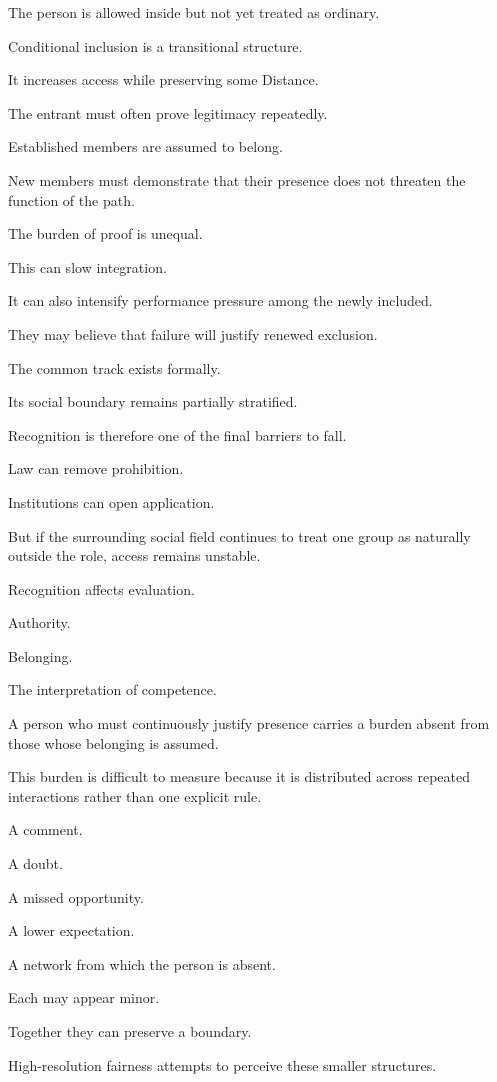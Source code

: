 The person is allowed inside but not yet treated as ordinary.

Conditional inclusion is a transitional structure.

It increases access while preserving some Distance.

The entrant must often prove legitimacy repeatedly.

Established members are assumed to belong.

New members must demonstrate that their presence does not threaten the function of the path.

The burden of proof is unequal.

This can slow integration.

It can also intensify performance pressure among the newly included.

They may believe that failure will justify renewed exclusion.

The common track exists formally.

Its social boundary remains partially stratified.

Recognition is therefore one of the final barriers to fall.

Law can remove prohibition.

Institutions can open application.

But if the surrounding social field continues to treat one group as naturally outside the role, access remains unstable.

Recognition affects evaluation.

Authority.

Belonging.

The interpretation of competence.

A person who must continuously justify presence carries a burden absent from those whose belonging is assumed.

This burden is difficult to measure because it is distributed across repeated interactions rather than one explicit rule.

A comment.

A doubt.

A missed opportunity.

A lower expectation.

A network from which the person is absent.

Each may appear minor.

Together they can preserve a boundary.

High-resolution fairness attempts to perceive these smaller structures.

